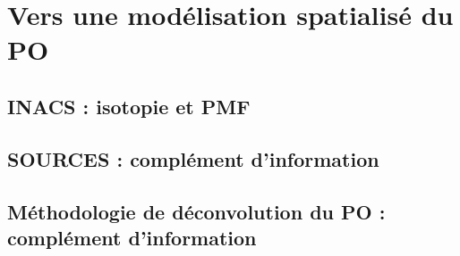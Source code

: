 \documentclass[a4paper,12pt]{book}
\begin{document}
% 

\chapter{Vers une modélisation spatialisé du PO}
\label{cha:spatio_temporal_modelizing}
\PartialToc
\clearpage
% 
\printbibliography[segment=\therefsegment,heading=subbibliography]

\printbibliography


\appendix
\setcounter{table}{0}
\setcounter{figure}{0}
\setcounter{equation}{0}
\renewcommand{\thetable}{\thesection-\arabic{table}}
\renewcommand{\thefigure}{\thesection-\arabic{figure}}
\renewcommand{\theequation}{\thesection-\arabic{equation}}

\section{INACS : isotopie et PMF}%
\label{annexe:INACS}
% 

\section{SOURCES : complément d'information}
\label{annexe:SOURCES_SI}
% 

\section{Méthodologie de déconvolution du PO : complément d'information}
\label{annexe:deconvol_OP_SI}


\end{document}
